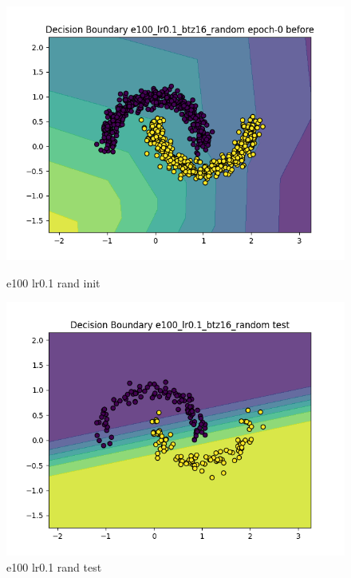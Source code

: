 \documentclass[8pt]{article}
\begin{document}
\begin{figure}[H]
    \begin{minipage}{0.32\textwidth}
        \centering
        \includegraphics[width=\textwidth]{../Prob4/out/1024_173617/e100_lr0.1_btz16_random/decision_boundary_epoch-0 before.png}
        \caption{e100 lr0.1 rand init}
        \label{fig:e100 lr0.1 rand init}
    \end{minipage}
    \begin{minipage}{0.32\textwidth}
        \centering
        \includegraphics[width=\textwidth]{../Prob4/out/1024_173617/e100_lr0.1_btz16_random/decision_boundary_test.png}
        \caption{e100 lr0.1 rand test}
        \label{fig:e100 lr0.1 rand test}
    \end{minipage}

\end{figure}
\end{document}
